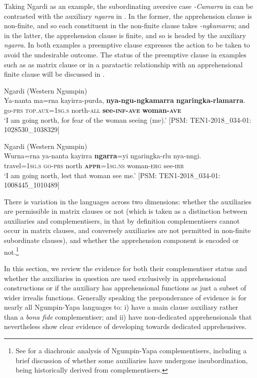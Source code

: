 \documentclass[output=paper,colorlinks,citecolor=brown]{langscibook}
\begin{document}
Taking Ngardi as an example, the subordinating aversive case \textit{-Camarra} in  can be contrasted with the auxiliary \textit{ngarra} in . In the former, the apprehension clause is non-finite, and so each constituent in the non-finite clause takes \mbox{\textit{-ngkamarra}}; and in the latter, the apprehension clause is finite, and so is headed by the auxiliary \textit{ngarra}. In both examples a preemptive clause expresses the action to be taken to avoid the undesirable outcome. The status of the preemptive clause in examples such as  as matrix clause or in a paratactic relationship with an apprehensional finite clause will be discussed in .


\ea 
\textnormal{Ngardi (Western Ngumpin)} \\
\gll Ya-nanta ma=rna kayirra-purda, \textbf{nya-ngu-ngkamarra} \textbf{ngaringka-rlamarra}. \\
go-\textsc{prs} \textsc{top.aux=1sg.s} north-\textsc{all} \textbf{see-\textsc{inf-ave}} \textbf{woman-\textsc{ave}} \\
\glt `I am going north, for fear of the woman seeing (me).' $[$PSM: TEN1-2018\_034-01: 1028530\_1038329$]$
\label{ex:bro43}
\z

\ea 
\textnormal{Ngardi (Western Ngumpin)} \\
\gll Wurna=rna ya-nanta kayirra \textbf{ngarra}=yi ngaringka-rlu nya-nngi. \\
travel=\textsc{1sg.s} \textsc{go-prs} north \textsc{\textbf{appr}=1sg.ns} woman-\textsc{erg} see-\textsc{irr} \\
\glt `I am going north, lest that woman see me.' $[$PSM: TEN1-2018\_034-01: 1008445\_1010489$]$
\label{ex:bro44}
\z

 There is variation in the languages across two dimensions: whether the auxiliaries are permissible in matrix clauses or not (which is taken as a distinction between auxiliaries and complementisers, in that by definition complementisers cannot occur in matrix clauses, and conversely auxiliaries are not permitted in non-finite subordinate clauses), and whether the apprehension component is encoded or not.\footnote{See \citet{mcconvell_grammaticalization_2006} for a diachronic analysis of Ngumpin-Yapa complementisers, including a brief discussion of whether some auxiliaries have undergone insubordination, being historically derived from complementisers.}

In this section, we review the evidence for both their complementiser status and whether the auxiliaries in question are used exclusively in apprehensional constructions or if the auxiliary has apprehensional functions as just a subset of wider irrealis functions. Generally speaking the preponderance of evidence is for nearly all Ngumpin-Yapa languages to: i) have a main clause auxiliary rather than a \textit{bona fide} complementiser; and ii) have non-dedicated apprehensionals that nevertheless show clear evidence of developing towards dedicated apprehensives. 
\end{document}
